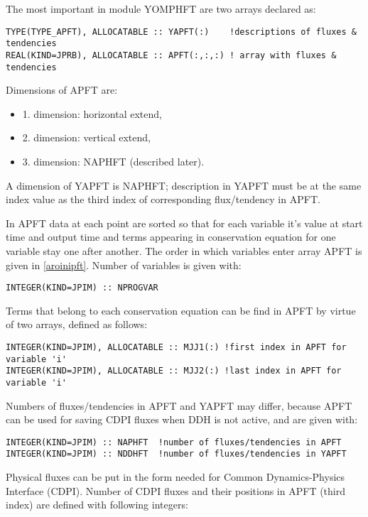 The most important in module YOMPHFT are two arrays declared as:
\begin{verbatim}
TYPE(TYPE_APFT), ALLOCATABLE :: YAPFT(:)    !descriptions of fluxes & tendencies
REAL(KIND=JPRB), ALLOCATABLE :: APFT(:,:,:) ! array with fluxes & tendencies
\end{verbatim}

Dimensions of APFT are:
\begin{itemize}
\item {1. dimension: } horizontal extend, \par
\item {2. dimension: } vertical extend, \par
\item {3. dimension: } NAPHFT (described later). \par
\end{itemize}

A dimension of YAPFT is NAPHFT; description in YAPFT must be at the same index value as the third index of corresponding flux/tendency in APFT.

In APFT data at each point are sorted so that for each variable it's value at start time and output time and terms appearing in conservation equation for one variable stay one after another. The order in which variables enter array APFT is given in \ref{aroinipft}.
Number of variables is given with:
\begin{verbatim}
INTEGER(KIND=JPIM) :: NPROGVAR 
\end{verbatim}

Terms that belong to each conservation equation can be find in APFT by virtue of two arrays, defined as follows:
\begin{verbatim}
INTEGER(KIND=JPIM), ALLOCATABLE :: MJJ1(:) !first index in APFT for variable 'i'
INTEGER(KIND=JPIM), ALLOCATABLE :: MJJ2(:) !last index in APFT for variable 'i'
\end{verbatim}

Numbers of fluxes/tendencies in APFT and YAPFT may differ, because APFT can be used for saving CDPI fluxes when DDH is not active, and are given with:
\begin{verbatim}
INTEGER(KIND=JPIM) :: NAPHFT  !number of fluxes/tendencies in APFT
INTEGER(KIND=JPIM) :: NDDHFT  !number of fluxes/tendencies in YAPFT
\end{verbatim}

Physical fluxes can be put in the form needed for Common Dynamics-Physics Interface (CDPI). Number of CDPI fluxes and their positions in APFT (third index) are defined with following integers:

